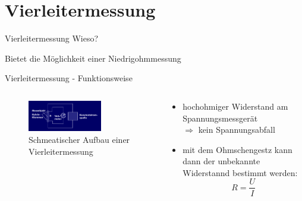 \section{Vierleitermessung}

\begin{frame}{Vierleitermessung}
Wieso?
\begin{center}
Bietet die Möglichkeit einer Niedrigohmmessung
\end{center}
\end{frame}

\begin{frame}{Vierleitermessung - Funktionsweise}
 \begin{columns}
   \begin{column}{0.49\textwidth}
  \begin{figure}
    \centering
    \includegraphics[width=0.7\textwidth]{bilder/vierleiter.png}
    \caption{Schmeatischer Aufbau einer Vierleitermessung}
    \label{fig: versuchsaufbau}
  \end{figure}
\end{column}
\begin{column}{0.49\textwidth}
  \begin{itemize}
    \item {hochohmiger Widerstand am Spannungsmessgerät \\
          $\Rightarrow$ kein Spannungsabfall \\ \hfill }
\item{ mit dem Ohmschengestz kann dann der unbekannte Widerstannd bestimmt werden:
\begin{equation*}
  R=\frac{U}{I}
\end{equation*}}
\end{itemize}
\end{column}
\end{columns}
\end{frame}

